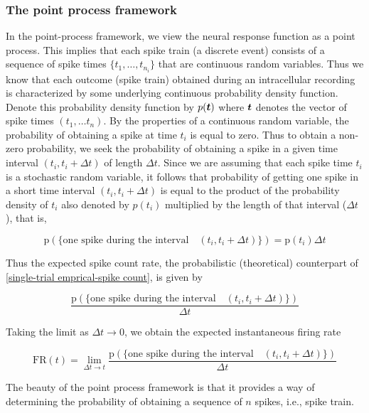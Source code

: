 \subsubsection{The point process framework}
In the point-process framework, we view the neural response function as a point process. This implies that each spike train (a discrete event) consists of a sequence of spike times $\{t_{1}, \ldots, t_{n_{i}} \}$ that are continuous random variables. Thus we know that each outcome (spike train)
obtained during an intracellular recording is characterized by some underlying continuous probability density function. Denote this probability density function by $p(\boldsymbol{t})$ where $\boldsymbol{t}$ denotes the vector of spike times $(t_{1}, \ldots t_{n})$. By the properties of a continuous random variable, the probability of obtaining a spike at time $t_{i}$ is equal to zero. Thus to obtain a non-zero probability, we seek the probability of obtaining a spike in a given time interval $(t_{i}, t_{i}+\Delta t)$ of length $\Delta t$.
Since we are assuming that each spike time $t_{i}$ is a stochastic random variable, it follows that  probability of getting one spike in a short time interval $(t_i, t_i+\Delta t)$ is equal to the product of  the probability density of $t_{i}$ also denoted by $p(t_{i})$ multiplied by the length 
of that interval ($\Delta t$), that is,

\[
\displaystyle \text{p}(\{\text{one spike during the interval} \quad (t_{i}, t_{i}+\Delta t) \}) = \text{p}(t_{i})\Delta t  
\]

Thus the expected spike count rate, the probabilistic (theoretical) counterpart
of \eqref{single-trial emprical-spike count}, is given by

\begin{equation}\label{expected count rate}
\displaystyle 
\dfrac{\text{p}(\{\text{one spike during the interval} \quad (t_{i}, t_{i}+\Delta t) \})}{\Delta t} 
\end{equation}

Taking the limit as $\Delta t \rightarrow 0$, we obtain the expected instantaneous  firing rate
 
\begin{equation}\label{expected instant Firerate}
\displaystyle 
\text{FR}(t) =  \lim_{\Delta t \rightarrow t}  \dfrac{\text{p}(\{\text{one spike during the interval} \quad (t_{i}, t_{i}+\Delta t)\})}{\Delta t} 
\end{equation}

The beauty of the point process framework is that it provides a way of determining the probability of obtaining a sequence of $n$ spikes, i.e., spike train.

